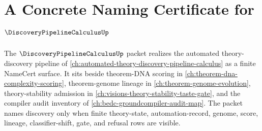 \chapter{A Concrete Naming Certificate for $\DiscoveryPipelineCalculusUp$}
\label{ch:concrete-instances-discovery-pipeline-calculus-namecert}

The $\DiscoveryPipelineCalculusUp$ packet realizes the automated theory-discovery pipeline of \autoref{ch:automated-theory-discovery-pipeline-calculus} as a finite NameCert surface. It sits beside theorem-DNA scoring in \autoref{ch:theorem-dna-complexity-scoring}, theorem-genome lineage in \autoref{ch:theorem-genome-evolution}, theory-stability admission in \autoref{ch:visions-theory-stability-taste-gate}, and the compiler audit inventory of \autoref{ch:bedc-groundcompiler-audit-map}. The packet names discovery only when finite theory-state, automation-record, genome, score, lineage, classifier-shift, gate, and refusal rows are visible.

